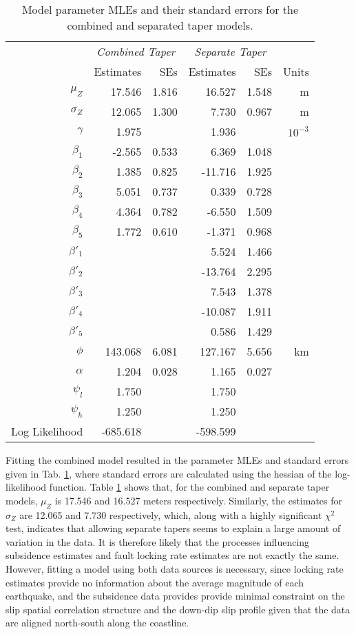{\begin{table}[ht]
\centering
\begin{tabular}{rrrrrr}
  \hline
  & \multicolumn{2}{c}{\textit{Combined Taper}} & \multicolumn{2}{c}{\textit{Separate Taper}} \\ 
 & Estimates & SEs & Estimates & SEs & Units \\ 
  \hline
  $\mu_Z$ & 17.546 & 1.816 & 16.527 & 1.548 & m \\ 
  $\sigma_Z$ & 12.065 & 1.300 & 7.730 & 0.967 & m \\ 
  $\gamma$ & 1.975 &  & 1.936 & & $10^{-3}$  \\ 
  $\beta_1$ & -2.565 & 0.533 & 6.369 & 1.048 & \\ 
  $\beta_2$ & 1.385 & 0.825 & -11.716 & 1.925 & \\ 
  $\beta_3$ & 5.051 & 0.737 & 0.339 & 0.728 & \\ 
  $\beta_4$ & 4.364 & 0.782 & -6.550 & 1.509 & \\ 
  $\beta_5$ & 1.772 & 0.610 & -1.371 & 0.968 & \\ 
  $\beta'_1$ &  &  & 5.524 & 1.466 & \\ 
  $\beta'_2$ &  &  & -13.764 & 2.295 & \\ 
  $\beta'_3$ &  &  & 7.543 & 1.378 & \\ 
  $\beta'_4$ &  &  & -10.087 & 1.911&  \\ 
  $\beta'_5$ &  &  & 0.586 & 1.429 & \\ 
  $\phi$ & 143.068 & 6.081 & 127.167 & 5.656 & km \\ 
  $\alpha$ & 1.204 & 0.028 & 1.165 & 0.027  & \\ 
  $\psi_l$ & 1.750 &  & 1.750 & &  \\ 
  $\psi_h$ & 1.250 &  & 1.250 &  & \\ 
  Log Likelihood & -685.618 & & -598.599 & \\
   \hline
\end{tabular}
\caption{Model parameter MLEs and their standard errors for the combined and separated taper models.}
\label{dataStats}
\end{table}

Fitting the combined model resulted in the parameter MLEs and standard errors given in Tab. \ref{dataStats}, where standard errors are calculated using the hessian of the log-likelihood function.  Table \ref{dataStats} shows that, for the combined and separate taper models, $\mu_Z$ is 17.546 and 16.527 meters respectively.  Similarly, the estimates for $\sigma_Z$ are 12.065 and 7.730 respectively, which, along with a highly significant $\chi^2$ test, indicates that allowing separate tapers seems to explain a large amount of variation in the data.  It is therefore likely that the processes influencing subsidence estimates and fault locking rate estimates are not exactly the same.  However, fitting a model using both data sources is necessary, since locking rate estimates provide no information about the average magnitude of each earthquake, and the subsidence data provides provide minimal constraint on the slip spatial correlation structure and the down-dip slip profile given that the data are aligned north-south along the coastline.

}
